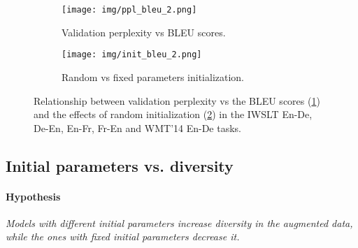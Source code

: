 \documentclass{article}
\begin{document}
\begin{figure}
\vspace{-1em}
\begin{center}
\begin{subfigure}{.49\textwidth}
    \begin{center}
        \texttt{[image: img/ppl\_bleu\_2.png]}
        \caption{Validation perplexity vs BLEU scores.}
        \label{fig:ppl_vs_bleu}
    \end{center}
\end{subfigure}
\begin{subfigure}{.49\textwidth}
  \begin{center}
    \texttt{[image: img/init\_bleu\_2.png]}
\caption{Random vs fixed parameters initialization.}
    \label{fig:init_vs_bleu}
  \end{center}
\end{subfigure}\end{center}
\vspace{-0.5em}
\caption{Relationship between validation perplexity vs the BLEU scores (\ref{fig:ppl_vs_bleu}) and the effects of random initialization (\ref{fig:init_vs_bleu}) in the IWSLT En-De, De-En, En-Fr, Fr-En and WMT'14 En-De tasks.}
\label{fig:ppl_vs_init_bleu}
\vspace{-1em}
\end{figure}



\subsection{Initial parameters vs. diversity}

\paragraph{Hypothesis} \emph{Models with different initial parameters increase diversity {in the augmented data}, while the ones with fixed initial parameters decrease it.} 

\vspace{-0.5em}
\end{document}
